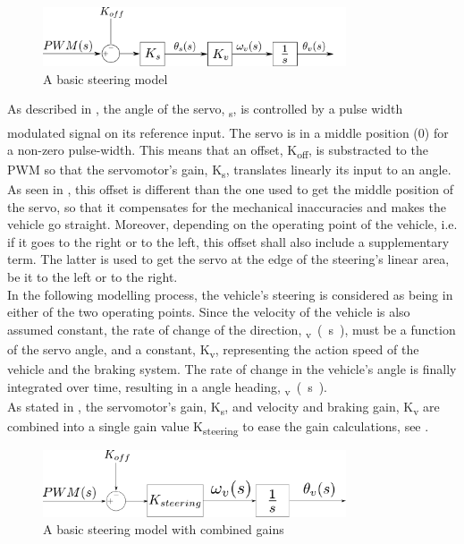 \begin{figure}[H]
	\centering
	\includegraphics[width=0.8\textwidth]{figures/basicSteeringModel.pdf}
	\caption{A basic steering model}
	\label{basicSteering}
\end{figure}
 
As described in , the angle of the servo, \si{\theta_{s}}, is controlled by a pulse width modulated signal on its reference input. The servo is in a middle position (\si{0^{\circ}}) for a non-zero pulse-width.
This means that an offset, \si{K_{off}}, is substracted to the PWM so that the servomotor's gain, \si{K_s}, translates linearly its input to an angle. As seen in , this offset is different than the one used to get the middle position of the servo, so that it compensates for the mechanical inaccuracies and makes the vehicle go straight. Moreover, depending on the operating point of the vehicle, i.e. if it goes to the right or to the left, this offset shall also include a supplementary term. The latter is used to get the servo at the edge of the steering's linear area, be it to the left or to the right.\\
%
In the following modelling process, the vehicle's steering is considered as being in either of the two operating points. Since the velocity of the vehicle is also assumed constant, the rate of change of the direction, \si{\omega_{v} (s)}, must be a function of the servo angle, and a constant, \si{K_v}, representing the action speed of the vehicle and the braking system.
The rate of change in the vehicle's angle is finally integrated over time, resulting in a angle heading, \si{\theta_{v} (s)}.\\
%
As stated in , the servomotor's gain, \si{K_s}, and velocity and braking gain, \si{K_v} are combined into a single gain value \si{K_{steering}} to ease the gain calculations, see .

\begin{figure}[H]
  \centering
  \includegraphics[width=0.8\textwidth]{figures/basicSteeringModelKCombinated.pdf}
  \caption{A basic steering model with combined gains}
  \label{fig:basicSteeringModelKCombinated}
\end{figure}


